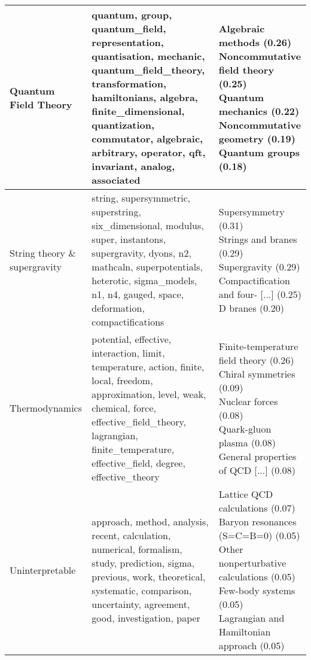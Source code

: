 \begin{longtable}{p{}|b{}|b{}}
             Quantum Field Theory & quantum, group, quantum\_field, representation, quantisation, mechanic, quantum\_field\_theory, transformation, hamiltonians, algebra, finite\_dimensional, quantization, commutator, algebraic, arbitrary, operator, qft, invariant, analog, associated &                                                                                      \shortstack[l]{Algebraic methods (0.26)\\ Noncommutative field theory (0.25)\\ Quantum mechanics (0.22)\\ Noncommutative geometry (0.19)\\ Quantum groups (0.18)}\\ \hline
    String theory \& supergravity &                                   string, supersymmetric, superstring, six\_dimensional, modulus, super, instantons, supergravity, dyons, n2, mathcaln, superpotentials, heterotic, sigma\_models, n1, n4, gauged, space, deformation, compactifications &                                                                                                     \shortstack[l]{Supersymmetry (0.31)\\ Strings and branes (0.29)\\ Supergravity (0.29)\\ Compactification and four- [...] (0.25)\\ D branes (0.20)}\\ \hline
                   Thermodynamics &               potential, effective, interaction, limit, temperature, action, finite, local, freedom, approximation, level, weak, chemical, force, effective\_field\_theory, lagrangian, finite\_temperature, effective\_field, degree, effective\_theory &                                                                         \shortstack[l]{Finite-temperature field theory (0.26)\\ Chiral symmetries (0.09)\\ Nuclear forces (0.08)\\ Quark-gluon plasma (0.08)\\ General properties of QCD [...] (0.08)}\\ \hline
                  Uninterpretable &                                                 approach, method, analysis, recent, calculation, numerical, formalism, study, prediction, sigma, previous, work, theoretical, systematic, comparison, uncertainty, agreement, good, investigation, paper &                                                \shortstack[l]{Lattice QCD calculations (0.07)\\ Baryon resonances (S=C=B=0) (0.05)\\ Other nonperturbative calculations (0.05)\\ Few-body systems (0.05)\\ Lagrangian and Hamiltonian approach (0.05)}\\ \hline

\end{longtable}
